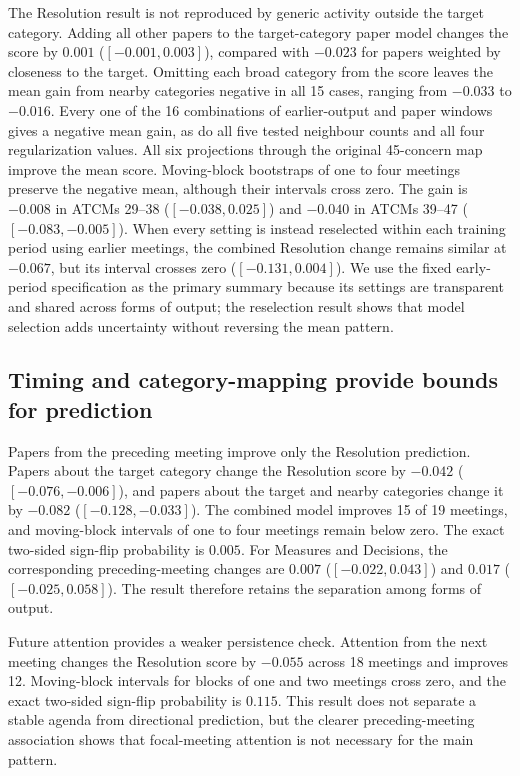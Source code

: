 \documentclass{fun_article}
\begin{document}
The Resolution result is not reproduced by generic activity outside the target category. Adding all other papers to the target-category paper model changes the score by $0.001$ ($[-0.001,0.003]$), compared with $-0.023$ for papers weighted by closeness to the target. Omitting each broad category from the score leaves the mean gain from nearby categories negative in all 15 cases, ranging from $-0.033$ to $-0.016$. Every one of the 16 combinations of earlier-output and paper windows gives a negative mean gain, as do all five tested neighbour counts and all four regularization values. All six projections through the original 45-concern map improve the mean score. Moving-block bootstraps of one to four meetings preserve the negative mean, although their intervals cross zero. The gain is $-0.008$ in ATCMs 29--38 ($[-0.038,0.025]$) and $-0.040$ in ATCMs 39--47 ($[-0.083,-0.005]$). When every setting is instead reselected within each training period using earlier meetings, the combined Resolution change remains similar at $-0.067$, but its interval crosses zero ($[-0.131,0.004]$). We use the fixed early-period specification as the primary summary because its settings are transparent and shared across forms of output; the reselection result shows that model selection adds uncertainty without reversing the mean pattern.

\subsection{Timing and category-mapping provide bounds for  prediction}\label{sec:forecast-audits}
Papers from the preceding meeting improve only the Resolution prediction. Papers about the target category change the Resolution score by $-0.042$ ($[-0.076,-0.006]$), and papers about the target and nearby categories change it by $-0.082$ ($[-0.128,-0.033]$). The combined model improves 15 of 19 meetings, and moving-block intervals of one to four meetings remain below zero. The exact two-sided sign-flip probability is $0.005$. For Measures and Decisions, the corresponding preceding-meeting changes are $0.007$ ($[-0.022,0.043]$) and $0.017$ ($[-0.025,0.058]$). The result therefore retains the separation among forms of output.

Future attention provides a weaker persistence check. Attention from the next meeting changes the Resolution score by $-0.055$ across 18 meetings and improves 12. Moving-block intervals for blocks of one and two meetings cross zero, and the exact two-sided sign-flip probability is $0.115$. This result does not separate a stable agenda from directional prediction, but the clearer preceding-meeting association shows that focal-meeting attention is not necessary for the main pattern.
\end{document}
